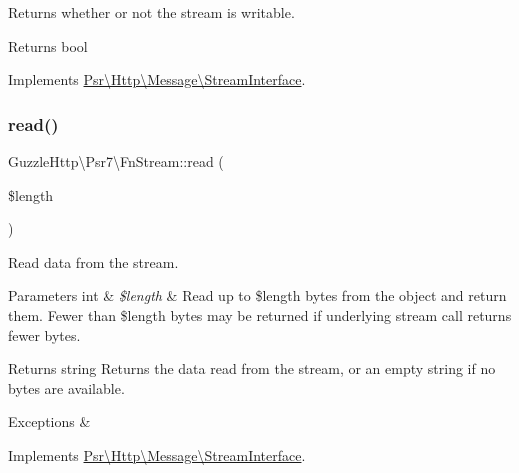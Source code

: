 Returns whether or not the stream is writable.

\begin{DoxyReturn}{Returns}
bool 
\end{DoxyReturn}


Implements \hyperlink{interfacePsr_1_1Http_1_1Message_1_1StreamInterface_a79287940d75d1951b831879fdc493883}{Psr\textbackslash{}\+Http\textbackslash{}\+Message\textbackslash{}\+Stream\+Interface}.

\mbox{\label{classGuzzleHttp_1_1Psr7_1_1FnStream_a514406fd0b0a778e0c94c5327ed7ce0c}} 
\subsubsection{\texorpdfstring{read()}{read()}}
{\footnotesize\ttfamily Guzzle\+Http\textbackslash{}\+Psr7\textbackslash{}\+Fn\+Stream\+::read (\begin{DoxyParamCaption}\item[{}]{\$length }\end{DoxyParamCaption})}

Read data from the stream.


\begin{DoxyParams}[1]{Parameters}
int & {\em \$length} & Read up to \$length bytes from the object and return them. Fewer than \$length bytes may be returned if underlying stream call returns fewer bytes. \\
\hline
\end{DoxyParams}
\begin{DoxyReturn}{Returns}
string Returns the data read from the stream, or an empty string if no bytes are available. 
\end{DoxyReturn}

\begin{DoxyExceptions}{Exceptions}
{\em } & \\
\hline
\end{DoxyExceptions}


Implements \hyperlink{interfacePsr_1_1Http_1_1Message_1_1StreamInterface_ad41b4afe827e179dfb4b988e98cccb12}{Psr\textbackslash{}\+Http\textbackslash{}\+Message\textbackslash{}\+Stream\+Interface}.

\mbox{\label{classGuzzleHttp_1_1Psr7_1_1FnStream_a8b27960dc20fe35531b4d1c2f124b605}} 
